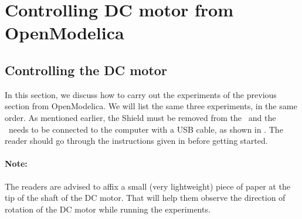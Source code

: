 \section{Controlling DC motor from OpenModelica}
\subsection{Controlling the DC motor}
In this section, we discuss how to carry out the experiments of the
previous section from OpenModelica.  We will list the same three experiments,
in the same order.  As mentioned earlier, the Shield must be removed from 
the \arduino\ and the \arduino\ needs to be connected to the computer 
with a USB cable, as shown in . The reader should go through the instructions given in
 before getting started.



\paragraph{Note:} The readers are advised to affix a small 
(very lightweight) piece of paper at the tip of the shaft of the DC motor. 
That will help them observe the direction of rotation 
of the DC motor while running the experiments.

